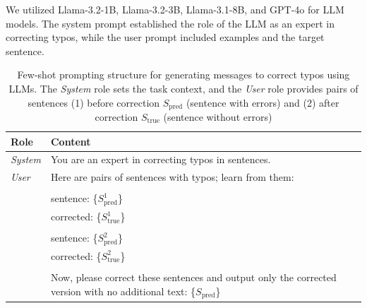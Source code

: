 We utilized Llama-3.2-1B, Llama-3.2-3B, Llama-3.1-8B, and GPT-4o for LLM models.
The system prompt established the role of the LLM as an expert in correcting typos, while the user prompt included examples and the target sentence. 
\par 
\begin{table}[htbp]
    \centering
    \begin{tabular}{p{1cm}|p{15cm}}
        \toprule
        \textbf{Role} & \textbf{Content} \\ \midrule
        \textit{System} & You are an expert in correcting typos in sentences. \\ 
        \midrule
        \textit{User} & Here are pairs of sentences with typos; learn from them: \\
             & \\
             & sentence: \{$S^{1}_{\text{pred}}$\} \\
             & corrected: \{$S^{1}_{\text{true}}$\} \\
             & \\
             & sentence: \{$S^{2}_{\text{pred}}$\} \\
             & corrected: \{$S^{2}_{\text{true}}$\} \\
             & \\
             & Now, please correct these sentences and output only the corrected version with no additional text: \{$S_{\text{pred}}$\} \\ 
        \bottomrule
    \end{tabular}
    \vspace{0.2em}
    \caption{Few-shot prompting structure for generating messages to correct typos using LLMs. The \textit{System} role sets the task context, and the \textit{User} role provides pairs of sentences (1) before correction $S_{\text{pred}}$ (sentence with errors) and (2) after correction $S_{\text{true}}$ (sentence without errors)}
    \label{tab:prompt_structure}
\end{table}


